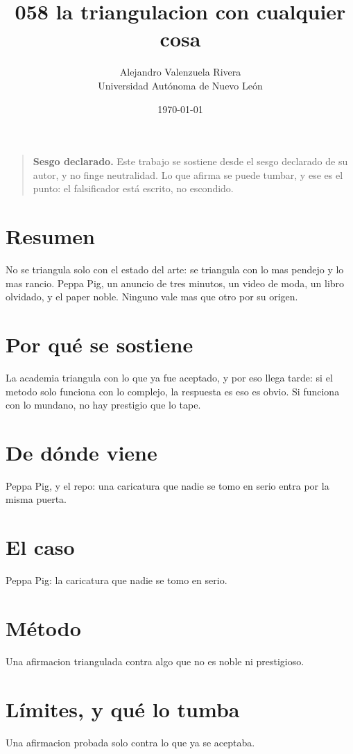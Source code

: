 \documentclass[11pt,a4paper]{article}
\title{058 la triangulacion con cualquier cosa}
\author{Alejandro Valenzuela Rivera\\\small Universidad Autónoma de Nuevo León}
\date{\today}
\begin{document}
\maketitle

\begin{quote}
\textbf{Sesgo declarado.} Este trabajo se sostiene desde el sesgo declarado de su autor, y no finge neutralidad. Lo que afirma se puede tumbar, y ese es el punto: el falsificador está escrito, no escondido.
\end{quote}

\section*{Resumen}
No se triangula solo con el estado del arte: se triangula con lo mas pendejo y lo mas rancio. Peppa Pig, un anuncio de tres minutos, un video de moda, un libro olvidado, y el paper noble. Ninguno vale mas que otro por su origen.

\section{Por qué se sostiene}
La academia triangula con lo que ya fue aceptado, y por eso llega tarde: si el metodo solo funciona con lo complejo, la respuesta es eso es obvio. Si funciona con lo mundano, no hay prestigio que lo tape.

\section{De dónde viene}
Peppa Pig, y el repo: una caricatura que nadie se tomo en serio entra por la misma puerta.

\section{El caso}
Peppa Pig: la caricatura que nadie se tomo en serio.

\section{Método}
Una afirmacion triangulada contra algo que no es noble ni prestigioso.

\section{Límites, y qué lo tumba}
Una afirmacion probada solo contra lo que ya se aceptaba.
\end{document}
